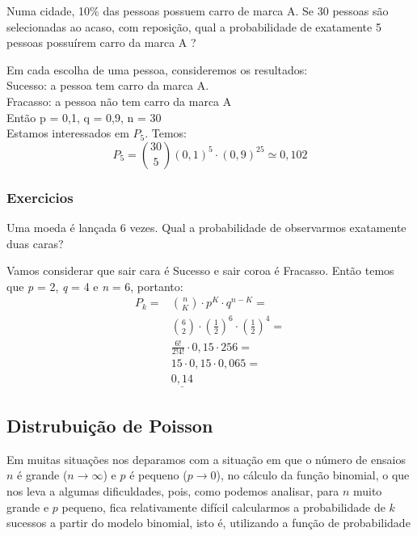\documentclass[10pt,a4paper]{article}
\begin{document}
\begin{eg}
	Numa cidade, 10\% das pessoas possuem carro de marca A. Se 30 pessoas são selecionadas ao acaso, com reposição, qual a probabilidade de exatamente 5 pessoas possuírem carro da marca A ?
	
	Em cada escolha de uma pessoa, consideremos os resultados:\\
	Sucesso: a pessoa tem carro da marca A.\\
	Fracasso: a pessoa não tem carro da marca A\\
	Então p = 0,1,    q = 0,9,    n = 30\\
	Estamos interessados em $P_{5}$. Temos:
	\[
		P_{5} = \binom{30}{5}(0,1)^{5} \cdot (0,9)^{25} \simeq 0,102	
	\]
\end{eg}

\subsubsection{Exercicios}
\begin{ex}
	Uma moeda é lançada 6 vezes. Qual a probabilidade de observarmos exatamente duas caras?
\end{ex}
\begin{sol}
	Vamos considerar que sair cara é Sucesso e sair coroa é Fracasso. Então temos que \textit{p} = 2, \textit{q} = 4 e \textit{n} = 6, portanto:
	\[
		\begin{aligned}
		P_{k} =& \binom{n}{K} \cdot p^{K} \cdot q^{n-K} =		\\
		& \binom{6}{2} \cdot (\frac{1}{2})^{6} \cdot (\frac{1}{2})^{4} =\\
		& \frac{6!}{2!4!} \cdot 0,15 \cdot 256=\\
		& 15 \cdot 0,15 \cdot 0,065=\\
		& \underline{0,14}
		\end{aligned}
	\]
\end{sol}

\subsection{Distrubuição de Poisson}
Em muitas situações nos deparamos com a situação em que o número de ensaios $ n $ é grande ($ n\rightarrow \infty $) e $ p $ é pequeno ($ p\rightarrow 0 $), no cálculo da função binomial, o que nos leva a algumas dificuldades, pois, como podemos analisar, para $ n $ muito grande e $ p $ pequeno, fica relativamente difícil calcularmos a probabilidade de $ k $ sucessos a partir do modelo binomial, isto é, utilizando a função de probabilidade
\end{document}
